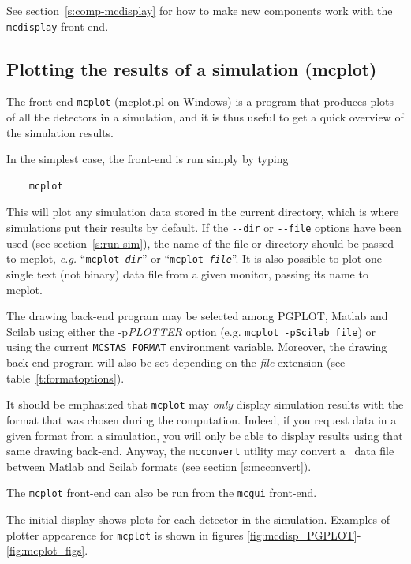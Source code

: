 See section~\ref{s:comp-mcdisplay} for how to make new components work
with the \verb+mcdisplay+ front-end.

\subsection{Plotting the results of a simulation (mcplot)}
\label{s:mcplot}

The front-end \verb+mcplot+ (mcplot.pl on Windows) is a program that produces
plots of all the detectors in a simulation, and it is thus useful to get
a quick overview of the simulation results.

In the simplest case, the front-end is run simply by typing
\begin{verbatim}
    mcplot
\end{verbatim}
This will plot any simulation data stored in the current directory,
which is where simulations put their results by default. If the
\verb+--dir+ or \verb+--file+ options have been used (see
section~\ref{s:run-sim}), the name of the file or directory should be
passed to mcplot, {\em e.g.} ``\texttt{mcplot {\it dir}}'' or ``\texttt{mcplot
  {\it file}}''.
It is also possible to plot one single text (not binary) data file from a given monitor, passing its name to mcplot.

The drawing back-end program may be selected among PGPLOT, Matlab and Scilab using either the -p{\it PLOTTER} option (e.g. \verb+mcplot -pScilab file+) or using the current \verb+MCSTAS_FORMAT+ environment variable.  Moreover, the drawing back-end program will also be set depending on the {\it file} extension (see table~\ref{t:formatoptions}).

It should be emphasized that \verb+mcplot+ may \emph{only} display simulation results with the format that was chosen during the computation. Indeed, if you request data in a given format from a simulation, you will only be able to display results using that same drawing back-end. Anyway, the \verb+mcconvert+ utility may convert a \MCS\ data file between Matlab and Scilab formats (see section \ref{s:mcconvert}).

The \verb+mcplot+ front-end can also be run from the \verb+mcgui+ front-end.

The initial display shows plots for each detector in the simulation.
Examples of plotter appearence for \verb+mcplot+ is shown in figures
 \ref{fig:mcdisp_PGPLOT}-\ref{fig:mcplot_figs}.

